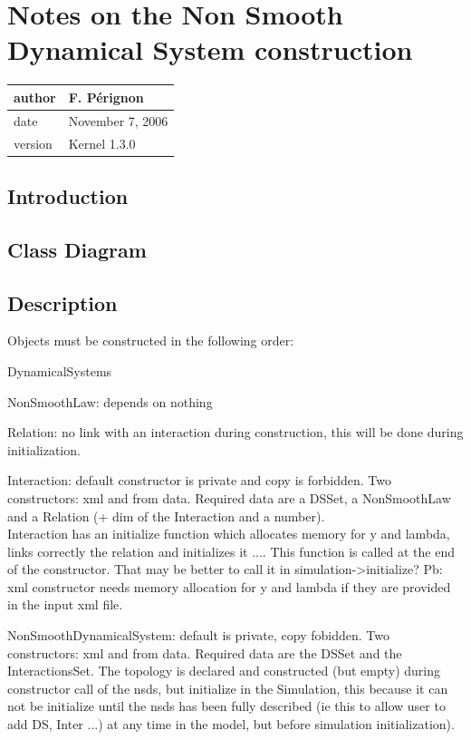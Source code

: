 \documentclass[10pt]{report}
\begin{document}
\chapter{Notes on the Non Smooth Dynamical System construction}
\begin{table}[!ht]
  \begin{tabular}{|l|l|}
    \hline
    author  & F.  P\'erignon \\
    \hline
    date    & November 7, 2006 \\
    \hline
    version & Kernel 1.3.0 \\
    \hline
  \end{tabular}
\end{table}

\section{Introduction}

\section{Class Diagram}

\section{Description}

Objects must be constructed in the following order:
\bei
\item DynamicalSystems
\item NonSmoothLaw: depends on nothing
\item Relation: no link with an interaction during construction, this will be done during initialization.
\item Interaction: default constructor is private and copy is forbidden. Two constructors: xml and from data. Required data are a DSSet, a NonSmoothLaw and
a Relation (+ dim of the Interaction and a number). \\
Interaction has an initialize function which allocates memory for y and lambda, links correctly the relation and initializes it .... This function is called at the
end of the constructor. That may be better to call it in simulation->initialize? Pb: xml constructor needs memory allocation for y and lambda if they are
provided in the input xml file.
\item NonSmoothDynamicalSystem: default is private, copy fobidden. Two constructors: xml and from data. Required data are the DSSet and the InteractionsSet.
The topology is declared and constructed (but empty) during constructor call of the nsds, but initialize in the Simulation, this because it can not be initialize until the nsds has been fully described (ie this to allow user to add DS, Inter ...) at any time in the model, but before simulation initialization).
\end{document}
